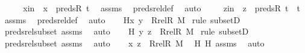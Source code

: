 \begin{isabellebody}
\ \ \isamarkupfalse%
\ \isamarkupfalse%
\ xin\ {\isacharcolon}{\kern0pt}\ {\isachardoublequoteopen}x\ {\isasymin}\ preds{\isacharparenleft}{\kern0pt}R{\isacharcomma}{\kern0pt}\ t{\isacharparenright}{\kern0pt}{\isachardoublequoteclose}\ \isamarkupfalse%
\ assms\ \isamarkupfalse%
\ preds{\isacharunderscore}{\kern0pt}rel{\isacharunderscore}{\kern0pt}def\ \isamarkupfalse%
\ auto\ \isanewline
\ \ \isamarkupfalse%
\ zin\ {\isacharcolon}{\kern0pt}\ {\isachardoublequoteopen}z\ {\isasymin}\ preds{\isacharparenleft}{\kern0pt}R{\isacharcomma}{\kern0pt}\ t{\isacharparenright}{\kern0pt}\ {\isasymunion}\ {\isacharbraceleft}{\kern0pt}t{\isacharbraceright}{\kern0pt}{\isachardoublequoteclose}\ \isamarkupfalse%
\ assms\ \isamarkupfalse%
\ preds{\isacharunderscore}{\kern0pt}rel{\isacharunderscore}{\kern0pt}def\ \isamarkupfalse%
\ auto\isanewline
\ \ \isamarkupfalse%
\ H{}{\isacharcolon}{\kern0pt}{\isachardoublequoteopen}{\isacharless}{\kern0pt}x{\isacharcomma}{\kern0pt}\ y{\isachargreater}{\kern0pt}\ {\isasymin}\ Rrel{\isacharparenleft}{\kern0pt}R{\isacharcomma}{\kern0pt}\ M{\isacharparenright}{\kern0pt}{\isachardoublequoteclose}\ \isamarkupfalse%
{\isacharparenleft}{\kern0pt}rule\ subsetD{\isacharparenright}{\kern0pt}\ \isamarkupfalse%
\ preds{\isacharunderscore}{\kern0pt}rel{\isacharunderscore}{\kern0pt}subset\ assms\ \isamarkupfalse%
\ auto\isanewline
\ \ \isamarkupfalse%
\ H{}{\isacharcolon}{\kern0pt}\ {\isachardoublequoteopen}{\isacharless}{\kern0pt}y{\isacharcomma}{\kern0pt}\ z{\isachargreater}{\kern0pt}\ {\isasymin}\ Rrel{\isacharparenleft}{\kern0pt}R{\isacharcomma}{\kern0pt}\ M{\isacharparenright}{\kern0pt}{\isachardoublequoteclose}\ \isamarkupfalse%
{\isacharparenleft}{\kern0pt}rule\ subsetD{\isacharparenright}{\kern0pt}\ \isamarkupfalse%
\ preds{\isacharunderscore}{\kern0pt}rel{\isacharunderscore}{\kern0pt}subset\ assms\ \isamarkupfalse%
\ auto\isanewline
\ \ \isamarkupfalse%
\ {\isachardoublequoteopen}{\isacharless}{\kern0pt}x{\isacharcomma}{\kern0pt}\ z{\isachargreater}{\kern0pt}\ {\isasymin}\ Rrel{\isacharparenleft}{\kern0pt}R{\isacharcomma}{\kern0pt}\ M{\isacharparenright}{\kern0pt}{\isachardoublequoteclose}\ \isamarkupfalse%
\ H{}\ H{}\ assms\ \isamarkupfalse%
\ auto\ \isanewline

\end{isabellebody}
